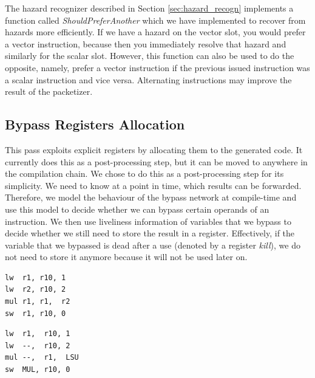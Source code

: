 
The hazard recognizer described in Section \ref{sec:hazard_recogn} implements a function called \emph{ShouldPreferAnother} which we have implemented to recover from hazards more efficiently. If we have a hazard on the vector slot, you would prefer a vector instruction, because then you immediately resolve that hazard and similarly for the scalar slot. However, this function can also be used to do the opposite, namely, prefer a vector instruction if the previous issued instruction was a scalar instruction and vice versa. Alternating instructions may improve the result of the packetizer. 

\subsection{Bypass Registers Allocation}
This pass exploits explicit registers by allocating them to the generated code. It currently does this as a post-processing step, but it can be moved to anywhere in the compilation chain. We chose to do this as a post-processing step for its simplicity. We need to know at a point in time, which results can be forwarded. Therefore, we model the behaviour of the bypass network at compile-time and use this model to decide whether we can bypass certain operands of an instruction. We then use liveliness information of variables that we bypass to decide whether we still need to store the result in a register. Effectively, if the variable that we bypassed is dead after a use (denoted by a register \emph{kill}), we do not need to store it anymore because it will not be used later on. 

\label{lst:explicit_reg_alloc}
\begin{center}
\hspace{2px}\begin{minipage}{.475\textwidth}
\begin{lstlisting}[frame=tlrb]
lw  r1, r10, 1
lw  r2, r10, 2
mul r1, r1,  r2
sw  r1, r10, 0
\end{lstlisting}
\end{minipage}\hfill
\begin{minipage}{.475\textwidth}
\begin{lstlisting}[frame=tlrb]
lw  r1,  r10, 1
lw  --,  r10, 2
mul --,  r1,  LSU
sw  MUL, r10, 0
\end{lstlisting}
\end{minipage}
\end{center}

